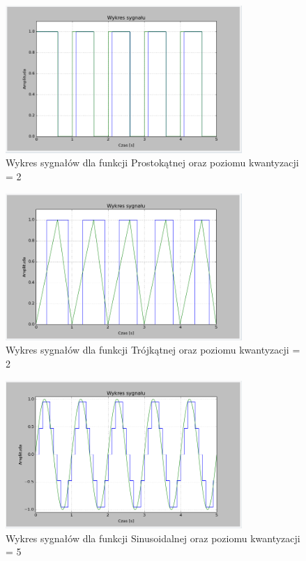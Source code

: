 \documentclass{article}
\begin{document}
    \begin{figure}[h!]
        \centering
        \includegraphics[width=0.8\textwidth]{img/1/quad_rect_2.png}
        \caption{Wykres sygnałów dla funkcji Prostokątnej oraz poziomu kwantyzacji = 2}
    \end{figure}
    \FloatBarrier

    \begin{figure}[h!]
        \centering
        \includegraphics[width=0.8\textwidth]{img/1/quad_tri_2.png}
        \caption{Wykres sygnałów dla funkcji Trójkątnej oraz poziomu kwantyzacji = 2}
    \end{figure}
    \FloatBarrier

    \begin{figure}[h!]
        \centering
        \includegraphics[width=0.8\textwidth]{img/1/quad_sin_5.png}
        \caption{Wykres sygnałów dla funkcji Sinusoidalnej oraz poziomu kwantyzacji = 5}
    \end{figure}
    \FloatBarrier
\end{document}
